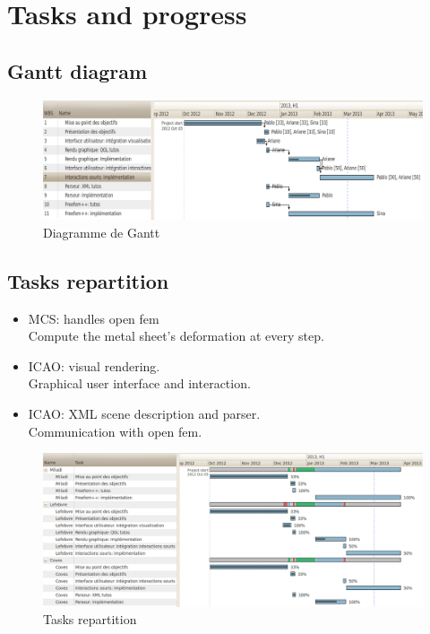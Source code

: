 \documentclass{beamer}
\begin{document}
\section{Tasks and progress}
\subsection{Gantt diagram}
\begin{frame}
    \begin{figure}
        \includegraphics[width=\textwidth]{img/gantt.png}
        \caption{Diagramme de Gantt}
        \label{DiagrammeDeGant}
    \end{figure}
\end{frame}
\subsection{Tasks repartition}
\begin{frame}
    \begin{itemize}
        \item MCS: handles open fem\\
            Compute the metal sheet's deformation at every step.
        \item ICAO: visual rendering.\\
            Graphical user interface and interaction.
        \item ICAO: XML scene description and parser.\\
            Communication with open fem.
    \end{itemize}
\end{frame}
\begin{frame}
    \begin{figure}
        \includegraphics[width=\textwidth]{img/ganttRepartition.png}
        \caption{Tasks repartition}
        \label{Répartition}
    \end{figure}
\end{frame}
\end{document}
